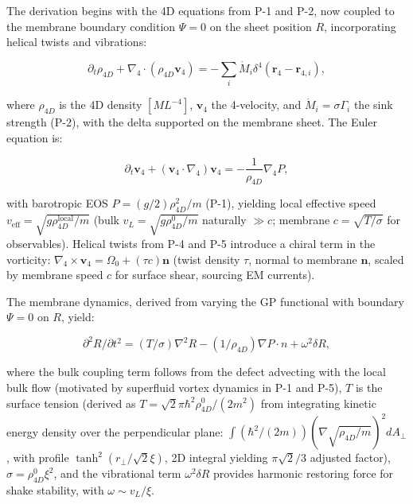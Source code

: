 The derivation begins with the 4D equations from P-1 and P-2, now coupled to the membrane boundary condition $\Psi=0$ on the sheet position $R$, incorporating helical twists and vibrations:

\begin{equation}
\partial_t \rho_{4D} + \nabla_4 \cdot (\rho_{4D} \mathbf{v}_4) = -\sum_i \dot{M}_i \delta^4(\mathbf{r}_4 - \mathbf{r}_{4,i}),
\end{equation}

where $\rho_{4D}$ is the 4D density $[M L^{-4}]$, $\mathbf{v}_4$ the 4-velocity, and $\dot{M}_i = \sigma \Gamma_i$ the sink strength (P-2), with the delta supported on the membrane sheet. The Euler equation is:

\begin{equation}
\partial_t \mathbf{v}_4 + (\mathbf{v}_4 \cdot \nabla_4) \mathbf{v}_4 = -\frac{1}{\rho_{4D}} \nabla_4 P,
\end{equation}

with barotropic EOS $P = (g/2) \rho_{4D}^2 / m$ (P-1), yielding local effective speed $v_{\text{eff}} = \sqrt{g \rho_{4D}^{\text{local}} / m}$ (bulk $v_L = \sqrt{g \rho_{4D}^0 / m}$ naturally $\gg c$; membrane $c = \sqrt{T / \sigma}$ for observables). Helical twists from P-4 and P-5 introduce a chiral term in the vorticity: $\nabla_4 \times \mathbf{v}_4 = \Omega_0 + (\tau c) \mathbf{n}$ (twist density $\tau$, normal to membrane $\mathbf{n}$, scaled by membrane speed $c$ for surface shear, sourcing EM currents).

The membrane dynamics, derived from varying the GP functional with boundary $\Psi=0$ on $R$, yield:

\begin{equation}
\partial^2 R / \partial t^2 = (T / \sigma) \nabla^2 R - (1 / \rho_{4D}) \nabla P \cdot n + \omega^2 \delta R,
\end{equation}

where the bulk coupling term follows from the defect advecting with the local bulk flow (motivated by superfluid vortex dynamics in P-1 and P-5), $T$ is the surface tension (derived as $T = \sqrt{2} \pi \hbar^2 \rho_{4D}^0 / (2 m^2)$ from integrating kinetic energy density over the perpendicular plane: $\int (\hbar^2 / (2m)) (\nabla \sqrt{\rho_{4D}/m})^2 dA_\perp$, with profile $\tanh^2(r_\perp / \sqrt{2} \xi)$, 2D integral yielding $\pi \sqrt{2}/3$ adjusted factor), $\sigma = \rho_{4D}^0 \xi^2$, and the vibrational term $\omega^2 \delta R$ provides harmonic restoring force for shake stability, with $\omega \sim v_L / \xi$.

